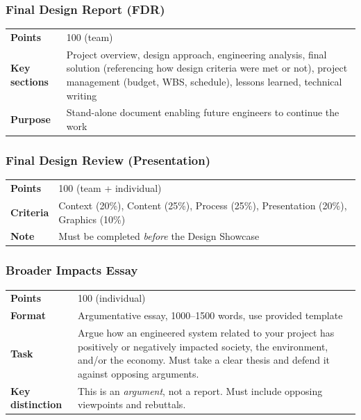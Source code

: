 \subsubsection{Final Design Report (FDR)}
\label{sssec:fdr-report}

\begin{tabularx}{\textwidth}{lX}
\toprule
\textbf{Points} & 100 (team) \\
\textbf{Key sections} & Project overview, design approach, engineering analysis, final solution (referencing how design criteria were met or not), project management (budget, WBS, schedule), lessons learned, technical writing \\
\textbf{Purpose} & Stand-alone document enabling future engineers to continue the work \\
\bottomrule
\end{tabularx}

\subsubsection{Final Design Review (Presentation)}
\label{sssec:fdr-presentation}

\begin{tabularx}{\textwidth}{lX}
\toprule
\textbf{Points} & 100 (team + individual) \\
\textbf{Criteria} & Context (20\%), Content (25\%), Process (25\%), Presentation (20\%), Graphics (10\%) \\
\textbf{Note} & Must be completed \emph{before} the Design Showcase \\
\bottomrule
\end{tabularx}

\subsubsection{Broader Impacts Essay}
\label{sssec:broader-impacts}

\begin{tabularx}{\textwidth}{lX}
\toprule
\textbf{Points} & 100 (individual) \\
\textbf{Format} & Argumentative essay, 1000--1500 words, use provided template \\
\textbf{Task} & Argue how an engineered system related to your project has positively or negatively impacted society, the environment, and/or the economy. Must take a clear thesis and defend it against opposing arguments. \\
\textbf{Key distinction} & This is an \emph{argument}, not a report. Must include opposing viewpoints and rebuttals. \\
\bottomrule
\end{tabularx}

